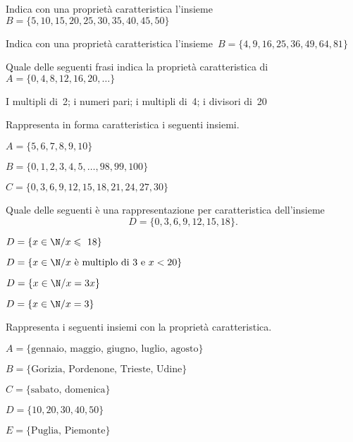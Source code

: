 \begin{esercizio}
\label{ese:6.12}
Indica con una proprietà caratteristica l'insieme~\(B=\{5, 10, 15, 20, 25, 
30, 
35, 40, 45, 50\}\)
\end{esercizio}

\begin{esercizio}
\label{ese:6.13}
Indica con una proprietà caratteristica
l'insieme~\(B=\{4, 9, 16, 25, 36, 49, 64, 81\}\)
\end{esercizio}

\begin{esercizio}
\label{ese:6.14}
Quale delle seguenti frasi indica la proprietà caratteristica
di~\(A=\{0, 4, 8, 12, 16, 20, \ldots\}\)
\begin{center}
\boxA\quad I multipli di~2; \quad\boxB\quad i numeri pari; \quad\boxC\quad i 
multipli di~4; \quad\boxD\quad i divisori di~20
\end{center}
\end{esercizio}

\begin{esercizio}
\label{ese:6.15}
Rappresenta in forma caratteristica i seguenti insiemi.
\begin{enumeratea}
\item \(A=\{5, 6, 7, 8, 9, 10\}\)
\item \(B=\{0, 1, 2, 3, 4, 5, \dots, 98, 99, 100\}\)
\item\( C=\{0, 3, 6, 9, 12, 15, 18, 21, 24, 27, 30\}\)
\end{enumeratea}
\end{esercizio}

\begin{esercizio}
\label{ese:6.16}
Quale delle seguenti è una rappresentazione per caratteristica
dell'insieme
\[D = \{0, 3, 6, 9, 12, 15, 18\}.\]
\begin{multicols}{2}
\begin{enumeratea}
\item \(D=\{x\in\N/x\leqslant~18\}\)
\item \(D=\{x\in\N/x\text{ è multiplo di~3 e }x<20\}\)%
\item \(D=\{x\in\N/x=3x\}\)
\item \(D=\{x\in\N/x=3\}\)
\end{enumeratea}
\end{multicols}
\end{esercizio}

\begin{esercizio}
\label{ese:6.17}
Rappresenta i seguenti insiemi con la proprietà caratteristica.
\begin{enumeratea}
 \item \(A=\{\text{gennaio, maggio, giugno, luglio, agosto}\}\)
 \item \(B=\{\text{Gorizia, Pordenone, Trieste, Udine}\}\)
 \item \(C=\{\text{sabato, domenica}\}\)
 \item \(D=\{10, 20, 30, 40, 50\}\)
 \item \(E=\{\text{Puglia, Piemonte}\}\)
 \end{enumeratea}
\end{esercizio}

